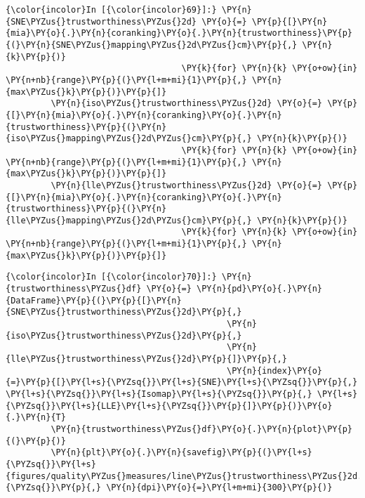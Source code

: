     \begin{Verbatim}[commandchars=\\\{\}]
{\color{incolor}In [{\color{incolor}69}]:} \PY{n}{SNE\PYZus{}trustworthiness\PYZus{}2d} \PY{o}{=} \PY{p}{[}\PY{n}{mia}\PY{o}{.}\PY{n}{coranking}\PY{o}{.}\PY{n}{trustworthiness}\PY{p}{(}\PY{n}{SNE\PYZus{}mapping\PYZus{}2d\PYZus{}cm}\PY{p}{,} \PY{n}{k}\PY{p}{)}
                                   \PY{k}{for} \PY{n}{k} \PY{o+ow}{in} \PY{n+nb}{range}\PY{p}{(}\PY{l+m+mi}{1}\PY{p}{,} \PY{n}{max\PYZus{}k}\PY{p}{)}\PY{p}{]}
         \PY{n}{iso\PYZus{}trustworthiness\PYZus{}2d} \PY{o}{=} \PY{p}{[}\PY{n}{mia}\PY{o}{.}\PY{n}{coranking}\PY{o}{.}\PY{n}{trustworthiness}\PY{p}{(}\PY{n}{iso\PYZus{}mapping\PYZus{}2d\PYZus{}cm}\PY{p}{,} \PY{n}{k}\PY{p}{)}
                                   \PY{k}{for} \PY{n}{k} \PY{o+ow}{in} \PY{n+nb}{range}\PY{p}{(}\PY{l+m+mi}{1}\PY{p}{,} \PY{n}{max\PYZus{}k}\PY{p}{)}\PY{p}{]}
         \PY{n}{lle\PYZus{}trustworthiness\PYZus{}2d} \PY{o}{=} \PY{p}{[}\PY{n}{mia}\PY{o}{.}\PY{n}{coranking}\PY{o}{.}\PY{n}{trustworthiness}\PY{p}{(}\PY{n}{lle\PYZus{}mapping\PYZus{}2d\PYZus{}cm}\PY{p}{,} \PY{n}{k}\PY{p}{)}
                                   \PY{k}{for} \PY{n}{k} \PY{o+ow}{in} \PY{n+nb}{range}\PY{p}{(}\PY{l+m+mi}{1}\PY{p}{,} \PY{n}{max\PYZus{}k}\PY{p}{)}\PY{p}{]}
\end{Verbatim}

    \begin{Verbatim}[commandchars=\\\{\}]
{\color{incolor}In [{\color{incolor}70}]:} \PY{n}{trustworthiness\PYZus{}df} \PY{o}{=} \PY{n}{pd}\PY{o}{.}\PY{n}{DataFrame}\PY{p}{(}\PY{p}{[}\PY{n}{SNE\PYZus{}trustworthiness\PYZus{}2d}\PY{p}{,}
                                            \PY{n}{iso\PYZus{}trustworthiness\PYZus{}2d}\PY{p}{,}
                                            \PY{n}{lle\PYZus{}trustworthiness\PYZus{}2d}\PY{p}{]}\PY{p}{,}
                                            \PY{n}{index}\PY{o}{=}\PY{p}{[}\PY{l+s}{\PYZsq{}}\PY{l+s}{SNE}\PY{l+s}{\PYZsq{}}\PY{p}{,} \PY{l+s}{\PYZsq{}}\PY{l+s}{Isomap}\PY{l+s}{\PYZsq{}}\PY{p}{,} \PY{l+s}{\PYZsq{}}\PY{l+s}{LLE}\PY{l+s}{\PYZsq{}}\PY{p}{]}\PY{p}{)}\PY{o}{.}\PY{n}{T}
         \PY{n}{trustworthiness\PYZus{}df}\PY{o}{.}\PY{n}{plot}\PY{p}{(}\PY{p}{)}
         \PY{n}{plt}\PY{o}{.}\PY{n}{savefig}\PY{p}{(}\PY{l+s}{\PYZsq{}}\PY{l+s}{figures/quality\PYZus{}measures/line\PYZus{}trustworthiness\PYZus{}2d.png}\PY{l+s}{\PYZsq{}}\PY{p}{,} \PY{n}{dpi}\PY{o}{=}\PY{l+m+mi}{300}\PY{p}{)}
\end{Verbatim}

